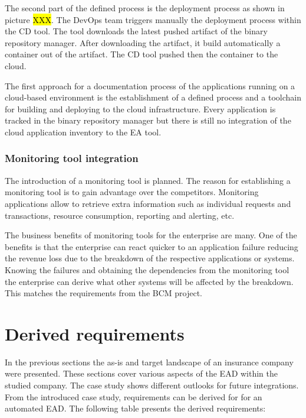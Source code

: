 The second part of the defined process is the deployment process as shown in picture \hl{XXX}. The DevOps team triggers manually the deployment process within the CD tool. The tool downloads the latest pushed artifact of the binary repository manager. After downloading the artifact, it build automatically a container out of the artifact. The CD tool pushed then the container to the cloud.

The first approach for a documentation process of the applications running on a cloud-based environment is the establishment of a defined process and a toolchain for building and deploying to the cloud infrastructure. Every application is tracked in the binary repository manager but there is still no integration of the cloud application inventory to the EA tool.

\subsubsection{Monitoring tool integration}

The introduction of a monitoring tool is planned. The reason for establishing a monitoring tool is to gain advantage over the competitors. Monitoring applications allow to retrieve extra information such as individual requests and transactions, resource consumption, reporting and alerting, etc.

The business benefits of monitoring tools for the enterprise are many. One of the benefits is that the enterprise can react quicker to an application failure reducing the revenue loss due to the breakdown of the respective applications or systems. Knowing the failures and obtaining the dependencies from the monitoring tool the enterprise can derive what other systems will be affected by the breakdown. This matches the requirements from the BCM project.

\section{Derived requirements}\label{section:derivedrequirements}

In the previous sections the as-is and target landscape of an insurance company were presented. These sections cover various aspects of the EAD within the studied company. The case study shows different outlooks for future integrations. From the introduced case study, requirements can be derived for for an automated EAD. The following table presents the derived requirements:

